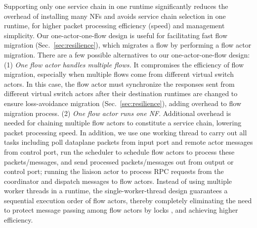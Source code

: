 \vspace{1mm}
 Supporting only one service chain in one runtime significantly reduces the overhead of installing many NFs and avoids service chain selection in one runtime, for higher packet processing efficiency (speed) and management simplicity. Our one-actor-one-flow design is useful for facilitating fast flow migration (Sec.~\ref{sec:resilience}), which migrates a flow by performing a flow actor migration.%
 There are a few possible alternatives to our one-actor-one-flow design: (1) {\em One flow actor handles multiple flows.} It compromises the efficiency of flow migration, especially when multiple flows come from different virtual switch actors. In this case, the flow actor must synchronize the responses sent from different virtual switch actors after their destination runtimes are changed to ensure loss-avoidance migration (Sec.~\ref{sec:resilience}), %
 adding overhead to flow migration process.
 (2) {\em One flow actor runs one NF}. Additional overhead is needed for chaining multiple flow actors to constitute a service chain, lowering packet processing speed. %
In addition, we use one working thread to carry out all tasks including poll dataplane packets from input port and remote actor messages from control port, run the scheduler to schedule flow actors to process these packets/messages, and send processed packets/messages out from output or control port; %
running the liaison actor to process RPC requests from the coordinator and dispatch %
messages to flow actors. Instead of using multiple worker threads in a runtime, the single-worker-thread design guarantees a sequential execution order of flow actors, thereby completely eliminating the need to protect message passing among flow actors by locks %
, and achieving higher efficiency.








